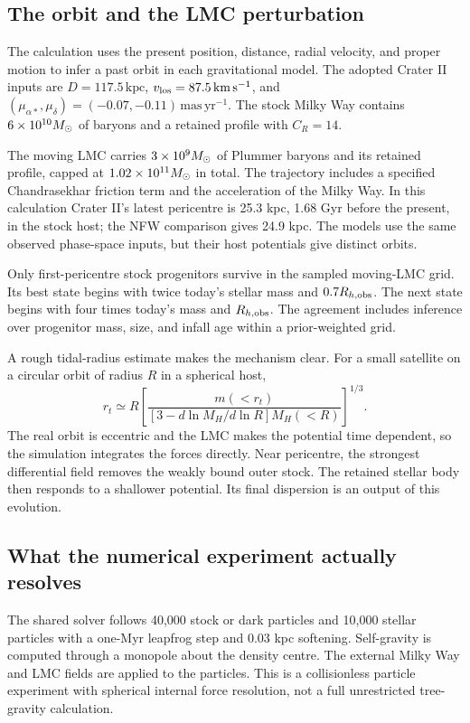 \subsection{The orbit and the LMC perturbation}

The calculation uses the present position, distance, radial velocity, and
proper motion to infer a past orbit in each gravitational model. The
adopted Crater II inputs are $D=117.5\,\mathrm{kpc}$,
$v_{\rm los}=87.5\,\mathrm{km\,s^{-1}}$, and
$(\mu_{\alpha*},\mu_\delta)=(-0.07,-0.11)\,\mathrm{mas\,yr^{-1}}$.
The stock Milky Way contains $6\times10^{10}M_\odot$ of baryons and a
retained profile with $C_R=14$.

The moving LMC carries $3\times10^9M_\odot$ of Plummer baryons and its
retained profile, capped at $1.02\times10^{11}M_\odot$ in total.
The trajectory includes a specified Chandrasekhar friction term and
the acceleration of the Milky Way. In this calculation Crater II's latest
pericentre is 25.3 kpc, 1.68 Gyr before the present, in the stock host;
the NFW comparison gives 24.9 kpc. The models use the same observed
phase-space inputs, but their host potentials give distinct orbits.

Only first-pericentre stock progenitors survive in the sampled moving-LMC
grid. Its best state begins with twice today's stellar mass and
$0.7R_{h,\rm obs}$. The next state begins with four times today's mass
and $R_{h,\rm obs}$. The agreement includes inference over progenitor
mass, size, and infall age within a prior-weighted grid.

A rough tidal-radius estimate makes the mechanism clear. For a small
satellite on a circular orbit of radius $R$ in a spherical host,
\begin{equation}
r_t\simeq R\left[
\frac{m(<r_t)}{[3-d\ln M_H/d\ln R]M_H(<R)}
\right]^{1/3}.
\end{equation}
The real orbit is eccentric and the LMC makes the potential time
dependent, so the simulation integrates the forces directly. Near
pericentre, the strongest differential field removes the weakly bound
outer stock. The retained stellar body then responds to a shallower
potential. Its final dispersion is an output of this evolution.

\subsection{What the numerical experiment actually resolves}

The shared solver follows 40,000 stock or dark particles and 10,000 stellar
particles with a one-Myr leapfrog step and 0.03 kpc softening. Self-gravity
is computed through a monopole about the density centre. The external
Milky Way and LMC fields are applied to the particles. This is a
collisionless particle experiment with spherical internal force
resolution, not a full unrestricted tree-gravity calculation.

